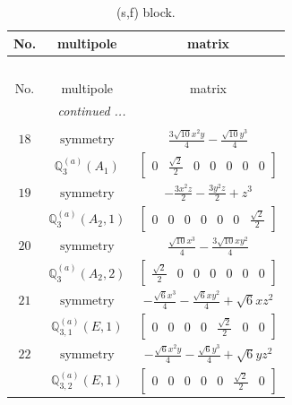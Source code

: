 \documentclass[fleqn,8pt,landscape]{jsarticle}
\begin{document}
\begin{longtable}{ccc}
\caption{(s,f) block.}
 \\
 \hline \hline
No. & multipole & matrix \\ \hline \endfirsthead

\multicolumn{2}{l}{\tablename\ \thetable{}} \\
 \hline \hline
No. & multipole & matrix \\ \hline \endhead

 \hline \hline
\multicolumn{2}{r}{\footnotesize\it continued ...} \\ \endfoot

 \hline \hline
\multicolumn{2}{r}{} \\ \endlastfoot

$ 18 $ & $ \text{symmetry} $ & $ \frac{3 \sqrt{10} x^{2} y}{4} - \frac{\sqrt{10} y^{3}}{4} $ \\
$  $ & $ \mathbb{Q}_{3}^{(a)}(A_{1}) $ & $ \begin{bmatrix} 0 & \frac{\sqrt{2}}{2} & 0 & 0 & 0 & 0 & 0 \end{bmatrix} $ \\ \hline
$ 19 $ & $ \text{symmetry} $ & $ - \frac{3 x^{2} z}{2} - \frac{3 y^{2} z}{2} + z^{3} $ \\
$  $ & $ \mathbb{Q}_{3}^{(a)}(A_{2},1) $ & $ \begin{bmatrix} 0 & 0 & 0 & 0 & 0 & 0 & \frac{\sqrt{2}}{2} \end{bmatrix} $ \\ \hline
$ 20 $ & $ \text{symmetry} $ & $ \frac{\sqrt{10} x^{3}}{4} - \frac{3 \sqrt{10} x y^{2}}{4} $ \\
$  $ & $ \mathbb{Q}_{3}^{(a)}(A_{2},2) $ & $ \begin{bmatrix} \frac{\sqrt{2}}{2} & 0 & 0 & 0 & 0 & 0 & 0 \end{bmatrix} $ \\ \hline
$ 21 $ & $ \text{symmetry} $ & $ - \frac{\sqrt{6} x^{3}}{4} - \frac{\sqrt{6} x y^{2}}{4} + \sqrt{6} x z^{2} $ \\
$  $ & $ \mathbb{Q}_{3,1}^{(a)}(E,1) $ & $ \begin{bmatrix} 0 & 0 & 0 & 0 & \frac{\sqrt{2}}{2} & 0 & 0 \end{bmatrix} $ \\ \hline
$ 22 $ & $ \text{symmetry} $ & $ - \frac{\sqrt{6} x^{2} y}{4} - \frac{\sqrt{6} y^{3}}{4} + \sqrt{6} y z^{2} $ \\
$  $ & $ \mathbb{Q}_{3,2}^{(a)}(E,1) $ & $ \begin{bmatrix} 0 & 0 & 0 & 0 & 0 & \frac{\sqrt{2}}{2} & 0 \end{bmatrix} $ \\ \hline

\end{longtable}
\end{document}
